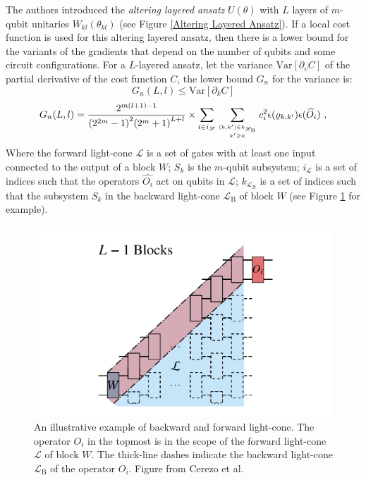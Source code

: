 The authors introduced the \emph{altering layered ansatz} $U(\theta)$ with $L$ layers of $m$-qubit unitaries $W_{kl}(\theta_{kl})$ (see Figure \ref{Altering Layered Ansatz}).
If a local cost function is used for this altering layered ansatz, then there is a lower bound for the variants of the gradients that depend on the number of qubits and some circuit configurations.
For a $L$-layered ansatz, let the variance $\mathrm{Var}[\partial_v C]$ of the partial derivative of the cost function $C$, the lower bound $G_n$ for the variance is:
\begin{equation}
    G_n(L,l) \leq \mathrm{Var}[\partial_k C]
\end{equation}
\begin{equation}
    G_n(L,l) = \frac{{2}^{m(l+1)-1}}{{({2}^{2m}-1)}^{2}{({2}^{m}+1)}^{L+l}}
    \times \mathop{\sum}\limits_{i\in {i}_{{\mathcal{L}}}}\mathop{\sum}\limits _{{(k,k^{\prime} )\in {k}_{{{\mathcal{L}}}_{\text{B}}}}\atop {k^{\prime} \geqslant k}}{c}_{i}^{2}\epsilon ({\rho }_{k,k^{\prime} })\epsilon ({\widehat{O}}_{i})\ ,
\end{equation}
Where the forward light-cone $\mathcal{L}$ is a set of gates with at least one input connected to the output of a block $W$;
$S_k$ is the $m$-qubit subsystem;
$i_{\mathcal{L}}$ is a set of indices such that the operators $\hat{O_i}$ act on qubits in $\mathcal{L}$;
$k_{\mathcal{L}_B}$ is a set of indices such that the subsystem $S_k$ in the backward light-cone $\mathcal{L}_\text{B}$ of block $W$ (see Figure \ref{Forward-backward light cone} for example).
\begin{figure}
    \centering
    \includegraphics[scale=0.5]{LiteratureReview/Appendices/lightcone.png}
    \caption{
    An illustrative example of backward and forward light-cone.
    The operator $O_i$ in the topmost is in the scope of the forward light-cone $\mathcal{L}$ of block $W$.
    The thick-line dashes indicate the backward light-cone $\mathcal{L}_{\text{B}}$ of the operator $O_i$.
    Figure from Cerezo et al. \cite{cerezoCostFunctionDependent2021}
    }
    \label{Forward-backward light cone}
\end{figure}

